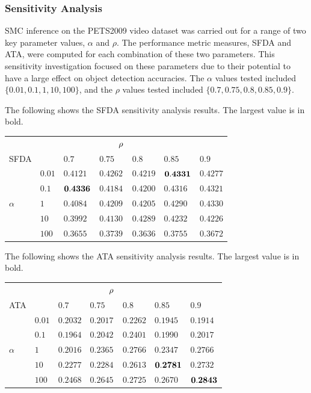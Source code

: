 \documentclass[smallcondensed, final]{svjour3}
\begin{document}
\subsubsection{Sensitivity Analysis}
\label{sec:sens_analysis}

SMC inference on the PETS2009 video dataset was carried out for a range of two key parameter values, $\alpha$ and $\rho$. The performance metric measures, SFDA and ATA, were computed for each combination of these two parameters. This sensitivity investigation focused on these parameters due to their potential to have a large effect on object detection accuracies. The $\alpha$ values tested included $\{ 0.01, 0.1, 1, 10, 100 \}$, and the $\rho$ values tested included $\{ 0.7, 0.75, 0.8, 0.85, 0.9 \}$.

The following shows the SFDA sensitivity analysis results. The largest value is in bold.
\begin{center}
\begin{tabular}[!]{l l  l  l  l  l  l}
  & & & $\hspace{8mm}\rho$ & & & \\
  SFDA  &  	& $0.7$ & $0.75$ & $0.8$ & $0.85$ & $0.9$  \\  
  &$0.01$ 	& $0.4121$ & $0.4262$ & $0.4219$ & $\bold{0.4331}$ & $0.4277$  \\
  &$0.1$  	& $\bold{0.4336}$ & $0.4184$ & $0.4200$ & $0.4316$ & $0.4321$  \\ 
$\alpha$ 	& $1$    & $0.4084$ & $0.4209$ & $0.4205$ & $0.4290$ & $0.4330$  \\  
  &$10$   	& $0.3992$ & $0.4130$ & $0.4289$ & $0.4232$ & $0.4226$  \\  
  &$100$  	& $0.3655$ & $0.3739$ & $0.3636$ & $0.3755$ & $0.3672$  \\
\end{tabular}
\end{center}

The following shows the ATA sensitivity analysis results. The largest value is in bold.
\begin{center}
\begin{tabular}[!]{l l  l  l  l  l  l}
		& & & $\hspace{8mm}\rho$ & & & \\
 	 ATA  & 	 	& $0.7$ & $0.75$ & $0.8$ & $0.85$ & $0.9$  \\  
	  &$0.01$ 		& $0.2032$ & $0.2017$ & $0.2262$ & $0.1945$ & $0.1914$  \\
		  &$0.1$ 	& $0.1964$ & $0.2042$ & $0.2401$ & $0.1990$ & $0.2017$  \\
$\alpha$ & $1$  	& $0.2016$ & $0.2365$ & $0.2766$ & $0.2347$ & $0.2766$  \\   
  		&$10$   	& $0.2277$ & $0.2284$ & $0.2613$ & $\bold{0.2781}$ & $0.2732$  \\  
 		 &$100$ 	& $0.2468$ & $0.2645$ & $0.2725$ & $0.2670$ & $\bold{0.2843}$  \\
\end{tabular}
\end{center}
\end{document}
